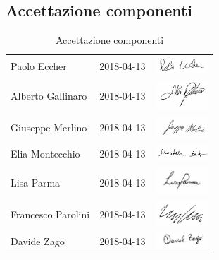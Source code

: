 	\subsection{Accettazione componenti}
		\begin{table}[H]
		\centering
		\begin{tabular}{|p{4cm}|C{4cm}|C{5cm}|}
			\hline
			 & & \\
			\hline			
			Paolo Eccher & 2018-04-13 & \includegraphics[width=2cm]{../../CommonImages/firme/paolo.png}  \\
			\hline
			Alberto Gallinaro & 2018-04-13 & \includegraphics[width=2cm]{../../CommonImages/firme/alberto.png} \\
			\hline
			Giuseppe Merlino & 2018-04-13 & \includegraphics[width=2cm]{../../CommonImages/firme/giuseppe.png} \\
			\hline
			Elia Montecchio & 2018-04-13 & \includegraphics[width=2cm]{../../CommonImages/firme/elia.png} \\
			\hline
			Lisa Parma & 2018-04-13 & \includegraphics[width=2cm]{../../CommonImages/firme/lisa.png} \\
			\hline
			Francesco Parolini & 2018-04-13 & \includegraphics[width=2cm]{../../CommonImages/firme/freppo.png} \\
			\hline
			Davide Zago & 2018-04-13 & \includegraphics[width=2cm]{../../CommonImages/firme/davide.png} \\
			\hline
		\end{tabular}
		\caption{Accettazione componenti}
	\end{table}

